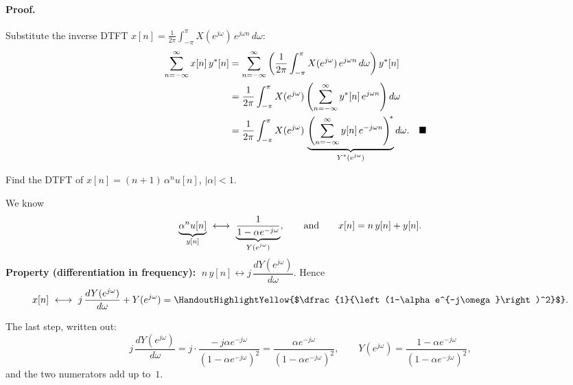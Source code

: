 \documentclass[handout_subfiles_root.tex]{subfiles}
\begin{document}
\paragraph{Proof.} Substitute the inverse DTFT $x[n] = \frac{1}{2\pi}\int_{-\pi}^{\pi} X(e^{j\omega})\,e^{j\omega n}\,d\omega$:
\begin{align*}
\sum_{n=-\infty}^{\infty} x[n]\,y^*[n]
&= \sum_{n=-\infty}^{\infty}\left(\frac{1}{2\pi}\int_{-\pi}^{\pi} X(e^{j\omega})\,e^{j\omega n}\,d\omega\right) y^*[n] \\
&= \frac{1}{2\pi}\int_{-\pi}^{\pi} X(e^{j\omega})\left(\sum_{n=-\infty}^{\infty} y^*[n]\,e^{j\omega n}\right) d\omega \\
&= \frac{1}{2\pi}\int_{-\pi}^{\pi} X(e^{j\omega})\,
  \underbrace{\left(\sum_{n=-\infty}^{\infty} y[n]\,e^{-j\omega n}\right)^{\!*}}_{\HandoutUnderbraceLabel{Y^*(e^{j\omega})}} d\omega. && \HandoutQEDalign
\end{align*}

\begin{examplebox}[title={Example}, handout mark=4]
Find the DTFT of $x[n] = (n+1)\,\alpha^n u[n]$, $|\alpha|<1$.

\noindent We know
\begin{equation*}
\underbrace{\alpha^n u[n]}_{\HandoutUnderbraceLabel{y[n]}} \ \longleftrightarrow\ \underbrace{\frac{1}{1-\alpha e^{-j\omega}}}_{\HandoutUnderbraceLabel{Y(e^{j\omega})}},
\qquad\text{and}\qquad x[n] = n\,y[n] + y[n].
\end{equation*}
\textbf{Property (differentiation in frequency):} $\;n\,y[n] \longleftrightarrow j\,\dfrac{dY(e^{j\omega})}{d\omega}$. Hence
\begin{equation*}
x[n] \ \longleftrightarrow\ j\,\frac{dY(e^{j\omega})}{d\omega} + Y(e^{j\omega})
= \HandoutHighlightYellow{$\dfrac{1}{\left(1-\alpha e^{-j\omega}\right)^2}$}.
\end{equation*}
\end{examplebox}

\begin{notebox}[title=\HandoutNoteAddendumTitle]
The last step, written out:
\begin{equation*}
j\,\frac{dY(e^{j\omega})}{d\omega}
= j\cdot\frac{-\,j\alpha e^{-j\omega}}{\left(1-\alpha e^{-j\omega}\right)^2}
= \frac{\alpha e^{-j\omega}}{\left(1-\alpha e^{-j\omega}\right)^2},
\qquad
Y(e^{j\omega}) = \frac{1-\alpha e^{-j\omega}}{\left(1-\alpha e^{-j\omega}\right)^2},
\end{equation*}
and the two numerators add up to~$1$.
\end{notebox}
\end{document}
